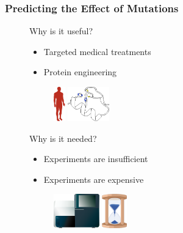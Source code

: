 \documentclass[10pt, british, luatex]{beamer}
\begin{document}
\begin{frame}
	\frametitle{Predicting the Effect of Mutations}
	\begin{figure}
		\begin{minipage}{.5\textwidth}%
			{%
				\Large%
				Why is it useful?
			}
			\vspace{1em}%
			\begin{itemize}
				\item Targeted medical treatments
				\item Protein engineering
			\end{itemize}
			\vspace{1em}%
			\begin{figure}
				\includegraphics[height=4em]{images/patient.pdf}
				\hspace{1em}
				\includegraphics[height=4em]{images/zincfinger.pdf}
			\end{figure}
		\end{minipage}%
		\hspace{2em}
		\begin{minipage}{.4\textwidth}%
			{%
				\Large%
				Why is it needed?
			}
			\vspace{1em}%
			\begin{itemize}
				\item Experiments are insufficient
				\item Experiments are expensive
			\end{itemize}
			\vspace{1em}%
			\begin{figure}
				\includegraphics[height=4em]{images/Illumina_miseq.pdf}
				\hspace{1em}%
				\includegraphics[height=4em]{images/sand-clock.pdf}

\end{figure}
\end{minipage}
\end{figure}
\end{frame}
\end{document}
